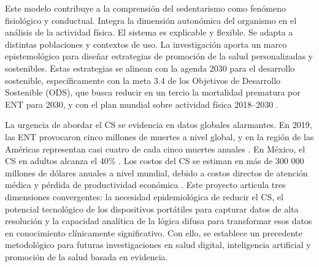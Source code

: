 Este modelo contribuye a la comprensión del sedentarismo como fenómeno fisiológico y conductual. Integra la dimensión autonómica del organismo en el análisis de la actividad física. El sistema es explicable y flexible. Se adapta a distintas poblaciones y contextos de uso. La investigación aporta un marco epistemológico para diseñar estrategias de promoción de la salud personalizadas y sostenibles. Estas estrategias se alinean con la agenda 2030 para el desarrollo sostenible, específicamente con la meta 3.4 de los Objetivos de Desarrollo Sostenible (ODS), que busca reducir en un tercio la mortalidad prematura por ENT para 2030, y con el plan mundial sobre actividad física 2018–2030 \cite{WHO2018}.

La urgencia de abordar el CS se evidencia en datos globales alarmantes. En 2019, las ENT provocaron cinco millones de muertes a nivel global, y en la región de las Américas representan casi cuatro de cada cinco muertes anuales \cite{StrategicPlanPAHO2020}. En México, el CS en adultos alcanza el 40\% \cite{Campos2023ObesityMexico}. Los costos del CS se estiman en más de 300 000 millones de dólares anuales a nivel mundial, debido a costos directos de atención médica y pérdida de productividad económica \cite{Okunogbe2021Economic}. Este proyecto articula tres dimensiones convergentes: la necesidad epidemiológica de reducir el CS, el potencial tecnológico de los dispositivos portátiles para capturar datos de alta resolución y la capacidad analítica de la lógica difusa para transformar esos datos en conocimiento clínicamente significativo. Con ello, se establece un precedente metodológico para futuras investigaciones en salud digital, inteligencia artificial y promoción de la salud basada en evidencia.



